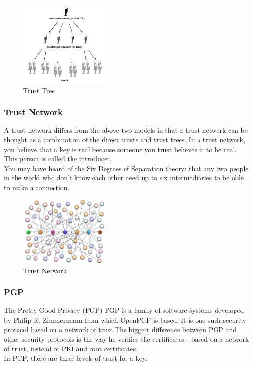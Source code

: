 \begin{figure}[H] %
    \centering %
    \includegraphics[width=0.4\textwidth]{figures/trustTree.png} %
    \caption{Trust Tree} %
    \label{Fig.4: Trust Tree} %
\end{figure}


\subsubsection{Trust Network}
A trust network differs from the above two models in that a trust network can be 
thought as a combination of the direct trusts and trust trees. In a trust 
network\cite{b27}, you believe that a key is real because someone you trust believes it to 
be real. This person is called the introducer\cite{b28}.
\\
You may have heard of the Six Degrees of Separation theory\cite{b37}: that any two people 
in the world who don't know each other need up to six intermediaries to be able 
to make a connection\cite{b29}.
\begin{figure}[H] %
    \centering %
    \includegraphics[width=0.4\textwidth]{figures/trustNet.png} %
    \caption{Trust Network} %
    \label{Fig.5: Trust Network} %
\end{figure}


\subsubsection{PGP}
The Pretty Good Privacy (PGP) PGP is a family of software systems
developed by Philip R. Zimmermann from which OpenPGP is based. It is 
one such security protocol based on 
a network of trust\cite{b11}.The biggest difference between PGP and other security protocols 
is the way he verifies the certificates - based on a network of trust, instead of PKI 
and root certificates\cite{b12}.
\\
In PGP, there are three levels of trust for a key:

